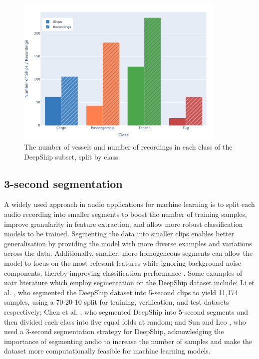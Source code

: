 \begin{figure}[p]
    \centering
    \includegraphics[width=0.9\textwidth]{img/ch3/deepship_class_analysis.pdf}
    \caption{The number of vessels and number of recordings in each class of the DeepShip subset, split by class.}
    \label{fig:deepship-subset-number-vessels}
\end{figure}

\subsection{3-second segmentation}

A widely used approach in audio applications for machine learning is to split each audio recording into smaller segments to boost the number of training samples, improve granularity in feature extraction, and allow more robust classification models to be trained. Segmenting the data into smaller clips enables better generalisation by providing the model with more diverse examples and variations across the data. Additionally, smaller, more homogeneous segments can allow the model to focus on the most relevant features while ignoring background noise components, thereby improving classification performance \cite{xu_self-supervised_2023}. Some examples of \acrshort{uatr} literature which employ segmentation on the DeepShip dataset include: Li et al. \cite{li_underwater_2022}, who segmented the DeepShip dataset into 5-second clips to yield 11,174 samples, using a 70-20-10 split for training, verification, and test datasets respectively; Chen et al. \cite{chen_hierarchical_2024}, who segmented DeepShip into 5-second segments and then divided each class into five equal folds at random; and Sun and Leo \cite{sun_underwater_2023}, who used a 3-second segmentation strategy for DeepShip, acknowledging the importance of segmenting audio to increase the number of samples and make the dataset more computationally feasible for machine learning models. 

